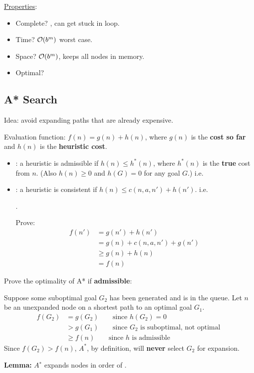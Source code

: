 \documentclass{ainote}
\begin{document}
\underline{Properties}:
\begin{itemize}
    \item Complete? , can get stuck in loop.
    \item Time? $\mathcal{O}(b^m)$ worst case.
    \item Space? $\mathcal{O}(b^m)$, keeps all nodes in memory.
    \item Optimal? 
\end{itemize}

\subsection{\hlyellow{$\star$}A* Search}
Idea: avoid expanding paths that are already expensive.

Evaluation function: $f(n)=g(n)+h(n)$, where $g(n)$ is the \textbf{cost so far} and $h(n)$ is the \textbf{heuristic cost}.
\begin{itemize}
    \item \textbf{}: a heuristic is admissible if $h(n)\le h^*(n)$, where $h^*(n)$ is the \textbf{true} cost from $n$. (Also $h(n)\ge 0$ and $h(G)=0$ for any goal $G$.) i.e. 
    

    \item \textbf{}: a heuristic is consistent if $h(n)\le c(n,a,n')+h(n')$. i.e. 
    
    .

    Prove:
    \begin{align*}
        f(n')&=g(n')+h(n') \\
        &=g(n)+c(n,a,n')+g(n') \\
        &\ge g(n)+h(n) \\
        &=f(n)
    \end{align*}
\end{itemize} 

\begin{info}
    Prove the optimality of A* if \textbf{admissible}:

    Suppose some suboptimal goal $G_2$ has been generated and is in the queue. Let $n$ be an unexpanded node on a shortest path to an optimal goal $G_1$.
    \begin{align*}
        f(G_2)&=g(G_2) \qquad\text{since $h(G_2)=0$} \\
        &>g(G_1) \qquad\text{since $G_2$ is suboptimal, not optimal} \\
        &\ge f(n) \qquad\text{since $h$ is admissible}
    \end{align*}
    Since $f(G_2)>f(n)$, $A^*$, by definition, will \textbf{never} select $G_2$ for expansion.

    \textbf{Lemma:} $A^∗$ expands nodes in order of .
\end{info}
\end{document}
